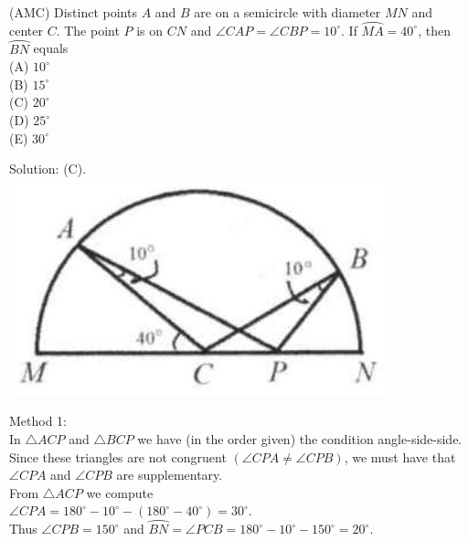 \documentclass{article}
\begin{document}
(AMC) Distinct points \(A\) and \(B\) are on a semicircle with diameter \(M N\) and center \(C\). The point \(P\) is on \(C N\) and \(\angle C A P=\angle C B P=10^{\circ}\). If \(\wideparen{M A}=40^{\circ}\), then \(\wideparen{B N}\) equals\\
(A) \(10^{\circ}\)\\
(B) \(15^{\circ}\)\\
(C) \(20^{\circ}\)\\
(D) \(25^{\circ}\)\\
(E) \(30^{\circ}\)

Solution: (C).\\
\centering
\includegraphics[width=\textwidth]{images/203(2).jpg}

Method 1:\\
In \(\triangle A C P\) and \(\triangle B C P\) we have (in the order given) the condition angle-side-side.\\
Since these triangles are not congruent \((\angle C P A \neq \angle C P B)\), we must have that \(\angle C P A\) and \(\angle C P B\) are supplementary.\\
From \(\triangle A C P\) we compute\\
\(\angle C P A=180^{\circ}-10^{\circ}-\left(180^{\circ}-40^{\circ}\right)=30^{\circ}\).\\
Thus \(\angle C P B=150^{\circ}\) and \(\wideparen{B N}=\angle P C B=180^{\circ}-10^{\circ}-150^{\circ}=20^{\circ}\).
\end{document}
